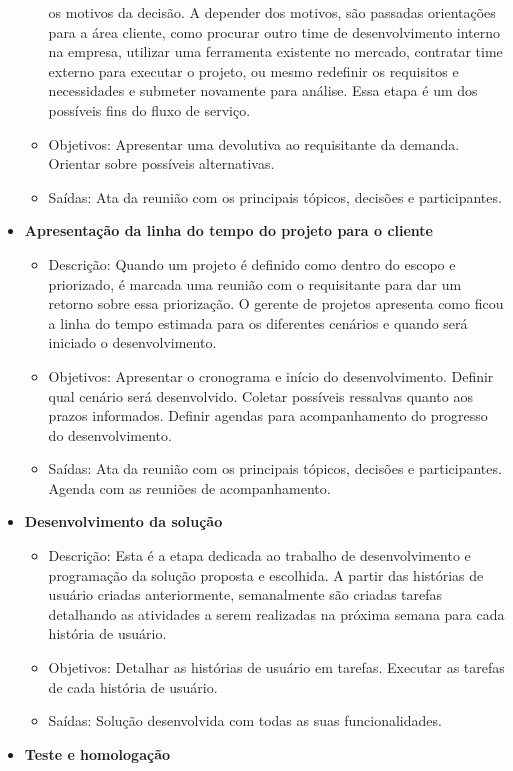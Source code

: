 \begin{itemize}
\begin{itemize}
			os motivos da decisão. A depender dos motivos, são passadas orientações para a área cliente, como procurar outro time de desenvolvimento interno na empresa,
			utilizar uma ferramenta existente no mercado, contratar time externo para executar o projeto, ou mesmo redefinir os requisitos e necessidades e submeter novamente para análise.
			Essa etapa é um dos possíveis fins do fluxo de serviço.
			\item Objetivos: Apresentar uma devolutiva ao requisitante da demanda. Orientar sobre possíveis alternativas.
			\item Saídas: Ata da reunião com os principais tópicos, decisões e participantes.
		\end{itemize}
		\item \textbf{Apresentação da linha do tempo do projeto para o cliente}
		\begin{itemize}
			\item Descrição: Quando um projeto é definido como dentro do escopo e priorizado, é marcada uma reunião com o requisitante
			para dar um retorno sobre essa priorização. O gerente de projetos apresenta como ficou a linha do tempo estimada para os diferentes cenários e quando será
			iniciado o desenvolvimento.
			\item Objetivos: Apresentar o cronograma e início do desenvolvimento. Definir qual cenário será desenvolvido. Coletar possíveis ressalvas quanto aos prazos informados.
			Definir agendas para acompanhamento do progresso do desenvolvimento.
			\item Saídas: Ata da reunião com os principais tópicos, decisões e participantes. Agenda com as reuniões de acompanhamento.
		\end{itemize}
		\item \textbf{Desenvolvimento da solução}
		\begin{itemize}
			\item Descrição: Esta é a etapa dedicada ao trabalho de desenvolvimento e programação da solução proposta e escolhida. A partir das histórias de usuário
			criadas anteriormente, semanalmente são criadas tarefas detalhando as atividades a serem realizadas na próxima semana para cada história de usuário.
			\item Objetivos: Detalhar as histórias de usuário em tarefas. Executar as tarefas de cada história de usuário.
			\item Saídas: Solução desenvolvida com todas as suas funcionalidades.
		\end{itemize}
		\item \textbf{Teste e homologação}

\end{itemize}
